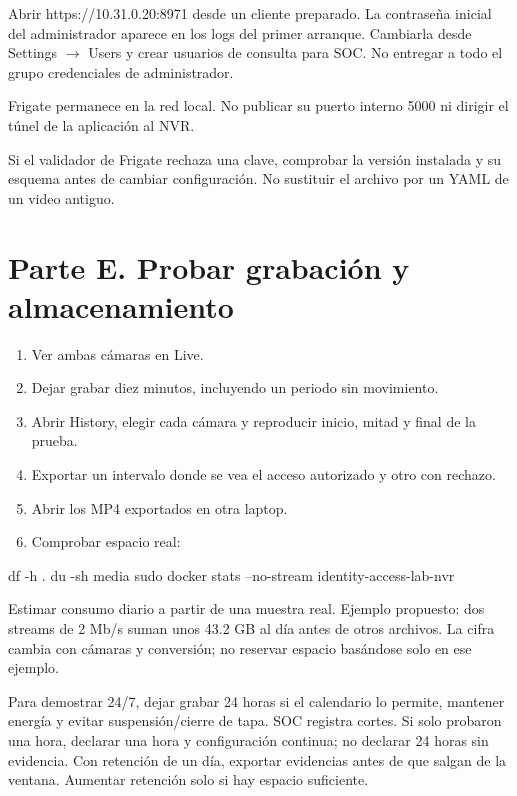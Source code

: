 \documentclass[12pt,a4paper]{article}
\begin{document}
Abrir \textnormal{https:/\allowbreak{}/\allowbreak{}10.31.0.20:8971} desde un cliente preparado. La contraseña inicial del administrador aparece en los logs del primer arranque. Cambiarla desde Settings \(\rightarrow\) Users y crear usuarios de consulta para SOC. No entregar a todo el grupo credenciales de administrador.\par
Frigate permanece en la red local. No publicar su puerto interno 5000 ni dirigir el túnel de la aplicación al NVR.\par
Si el validador de Frigate rechaza una clave, comprobar la versión instalada y su esquema antes de cambiar configuración. No sustituir el archivo por un YAML de un video antiguo.\par
{}\section*{Parte E. Probar grabación y almacenamiento}
\begin{enumerate}
\item Ver ambas cámaras en Live.
\item Dejar grabar diez minutos, incluyendo un periodo sin movimiento.
\item Abrir History, elegir cada cámara y reproducir inicio, mitad y final de la prueba.
\item Exportar un intervalo donde se vea el acceso autorizado y otro con rechazo.
\item Abrir los MP4 exportados en otra laptop.
\item Comprobar espacio real:
\end{enumerate}
\begin{Comandos}
df -h .
du -sh media
sudo docker stats --no-stream identity-access-lab-nvr
\end{Comandos}
Estimar consumo diario a partir de una muestra real. Ejemplo propuesto: dos streams de 2 Mb/s suman unos 43.2 GB al día antes de otros archivos. La cifra cambia con cámaras y conversión; no reservar espacio basándose solo en ese ejemplo.\par
Para demostrar 24/7, dejar grabar 24 horas si el calendario lo permite, mantener energía y evitar suspensión/cierre de tapa. SOC registra cortes. Si solo probaron una hora, declarar una hora y configuración continua; no declarar 24 horas sin evidencia. Con retención de un día, exportar evidencias antes de que salgan de la ventana. Aumentar retención solo si hay espacio suficiente.\par
\end{document}
